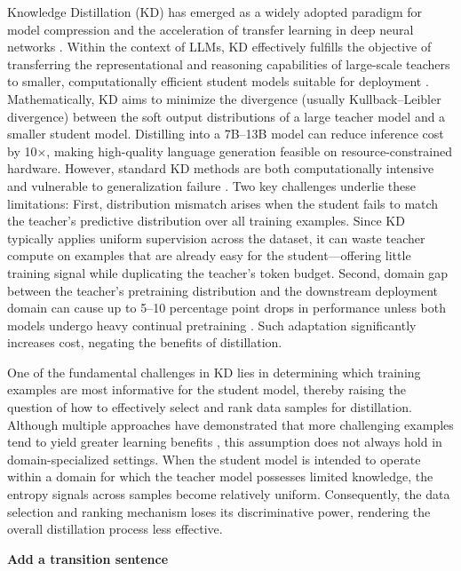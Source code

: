 Knowledge Distillation (KD) \cite{hinton} has emerged as a widely adopted paradigm for model compression and the acceleration of transfer learning in deep neural networks \cite{kd-survey}. 
Within the context of LLMs, KD effectively fulfills the objective of transferring the representational and reasoning capabilities of large-scale teachers to smaller, computationally efficient student models suitable for deployment \cite{xu2024survey}. 
Mathematically, KD aims to minimize the divergence (usually Kullback–Leibler divergence) between the soft output distributions of a large teacher model and a smaller student model. 
Distilling into a 7B–13B model can reduce inference cost by 10×, making high-quality language generation feasible on resource-constrained hardware. 
However, standard KD methods are both computationally intensive and vulnerable to generalization failure \cite{slmsurvey}. 
Two key challenges underlie these limitations: 
First, distribution mismatch \cite{gkd,distillm,distillm2} arises when the student fails to match the teacher’s predictive distribution over all training examples. 
Since KD typically applies uniform supervision across the dataset, it can waste teacher compute on examples that are already easy for the student—offering little training signal while duplicating the teacher's token budget.
Second, domain gap \cite{adaptanddistill} between the teacher’s pretraining distribution and the downstream deployment domain can cause up to 5–10 percentage point drops in performance unless both models undergo heavy continual pretraining \cite{adaptanddistill}. 
Such adaptation significantly increases cost, negating the benefits of distillation.

One of the fundamental challenges in KD lies in determining which training examples are most informative for the student model, thereby raising the question of how to effectively select and rank data samples for distillation. 
Although multiple approaches have demonstrated that more challenging examples tend to yield greater learning benefits \cite{eakd,dakd}, this assumption does not always hold in domain-specialized settings. 
When the student model is intended to operate within a domain for which the teacher model possesses limited knowledge, the entropy signals across samples become relatively uniform. 
Consequently, the data selection and ranking mechanism loses its discriminative power, rendering the overall distillation process less effective.

\textbf{Add a transition sentence}
